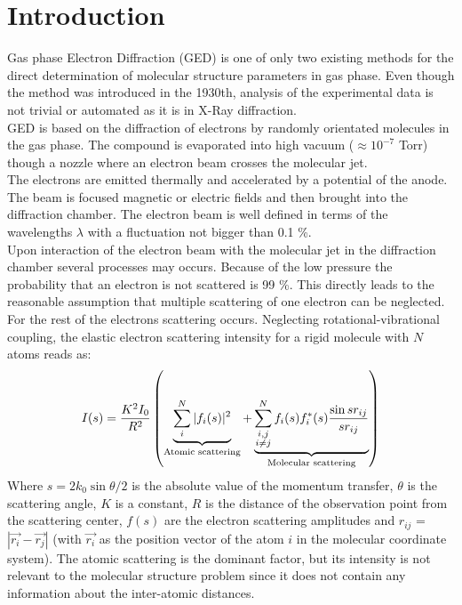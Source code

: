 \section{Introduction}
Gas phase Electron Diffraction  (GED) is one of only two existing methods for the direct determination of molecular structure parameters in gas phase. Even though the method  was introduced in the 1930th, analysis of the experimental data is not trivial or automated as it is in X-Ray diffraction.\\ 
GED is based on the diffraction of electrons by randomly orientated molecules in the gas phase. The compound is evaporated into high vacuum ($\approx 10^{-7}$ Torr) though a nozzle where an electron beam crosses the molecular jet.\\
The electrons are emitted thermally and accelerated by a potential of the anode.  The beam is focused magnetic or electric fields and then brought into the diffraction chamber. The electron beam is well defined in terms of the wavelengths $\lambda$ with a fluctuation not bigger than 0.1 \%. \\
Upon interaction of the electron beam with the molecular jet in the diffraction chamber  several processes may occurs. Because of the low pressure the probability that an electron is not scattered is 99 \%. This directly leads to the reasonable assumption that multiple scattering of one electron can be neglected. \\
For the rest of the electrons scattering occurs.  Neglecting rotational-vibrational coupling, the elastic electron scattering intensity for a rigid molecule with $N$ atoms reads as: 
\begin{equation*}
I(s) = \frac{K^2I_0}{R^2}\left(  \underbrace{\sum_i^N |f_i(s)|^2}_{\textnormal{Atomic scattering}} +  \underbrace{\sum^N_{ \substack{i,j \\ i\neq j}}f_i(s)f_i^*(s) \frac{\sin sr_{ij}}{sr_{ij}}}_{\textnormal{Molecular scattering}} \right)
\end{equation*}
Where $s = 2 k_0 \sin \theta/2$ is the absolute value of the momentum transfer, $\theta$ is the scattering angle, $K$ is a constant, $R$ is the distance of the observation point from the scattering center, $f(s)$ are the electron scattering amplitudes and $r_{ij}$ = $|\vec{r_i}-\vec{r_j}|$ (with $\vec{r_i}$ as the position vector of the atom $i$ in the molecular coordinate system). The atomic scattering is the dominant factor, but its intensity is not relevant to the molecular structure problem since it does not contain any information about the inter-atomic distances.  \\
